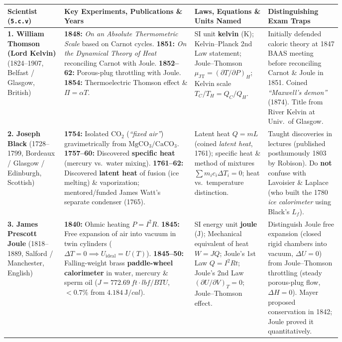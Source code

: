 \begin{center}
\label{tab:03:scientists}
\footnotesize\setlength{\tabcolsep}{3pt}\renewcommand{\arraystretch}{1.15}
\begin{tabularx}{\linewidth}{@{}>{\raggedright\arraybackslash}p{0.17\linewidth} >{\raggedright\arraybackslash}p{0.39\linewidth} >{\raggedright\arraybackslash}p{0.22\linewidth} >{\raggedright\arraybackslash}X@{}}\toprule
\textbf{Scientist (\texttt{5.c.v})} & \textbf{Key Experiments, Publications \& Years} & \textbf{Laws, Equations \& Units Named} & \textbf{Distinguishing Exam Traps} \\\midrule
\textbf{1. William Thomson (Lord Kelvin)} (1824--1907, Belfast / Glasgow, British) & \textbf{1848:} \emph{On an Absolute Thermometric Scale} based on Carnot cycles. \textbf{1851:} \emph{On the Dynamical Theory of Heat} reconciling Carnot with Joule. \textbf{1852--62:} Porous-plug throttling with Joule. \textbf{1854:} Thermoelectric Thomson effect \& $\Pi = \alpha T$. & SI unit \textbf{kelvin} ($\si{\kelvin}$); Kelvin--Planck 2nd Law statement; Joule--Thomson $\mu_{\mathrm{JT}} = (\partial T/\partial P)_H$; Kelvin scale $T_C/T_H = Q_C/Q_H$. & Initially defended caloric theory at 1847 BAAS meeting before reconciling Carnot \& Joule in 1851. Coined \emph{``Maxwell's demon''} (1874). Title from River Kelvin at Univ.\ of Glasgow. \\\midrule
\textbf{2. Joseph Black} (1728--1799, Bordeaux / Glasgow / Edinburgh, Scottish) & \textbf{1754:} Isolated $\mathrm{CO_2}$ (\emph{``fixed air''}) gravimetrically from $\mathrm{MgCO_3/CaCO_3}$. \textbf{1757--60:} Discovered \textbf{specific heat} (mercury vs.\ water mixing). \textbf{1761--62:} Discovered \textbf{latent heat} of fusion (ice melting) \& vaporization; mentored/funded James Watt's separate condenser (1765). & Latent heat $Q = mL$ (coined \emph{latent heat}, 1761); specific heat \& method of mixtures $\sum m_i c_i \Delta T_i = 0$; heat vs.\ temperature distinction. & Taught discoveries in lectures (published posthumously 1803 by Robison). Do \textbf{not} confuse with Lavoisier \& Laplace (who built the 1780 \emph{ice calorimeter} using Black's $L_f$). \\\midrule
\textbf{3. James Prescott Joule} (1818--1889, Salford / Manchester, English) & \textbf{1840:} Ohmic heating $P = I^2R$. \textbf{1845:} Free expansion of air into vacuum in twin cylinders ($\Delta T = 0 \implies U_{\mathrm{ideal}} = U(T)$). \textbf{1845--50:} Falling-weight brass \textbf{paddle-wheel calorimeter} in water, mercury \& sperm oil ($J = \SI{772.69}{ft\cdot lbf/BTU}$, $<0.7\%$ from $\SI{4.184}{\joule/cal}$). & SI energy unit \textbf{joule} ($\si{\joule}$); Mechanical equivalent of heat $W = JQ$; Joule's 1st Law $Q = I^2Rt$; Joule's 2nd Law $(\partial U/\partial V)_T = 0$; Joule--Thomson effect. & Distinguish Joule free expansion (closed rigid chambers into vacuum, $\Delta U = 0$) from Joule--Thomson throttling (steady porous-plug flow, $\Delta H = 0$). Mayer proposed conservation in 1842; Joule proved it quantitatively. \\\midrule

\end{tabularx}
\end{center}
